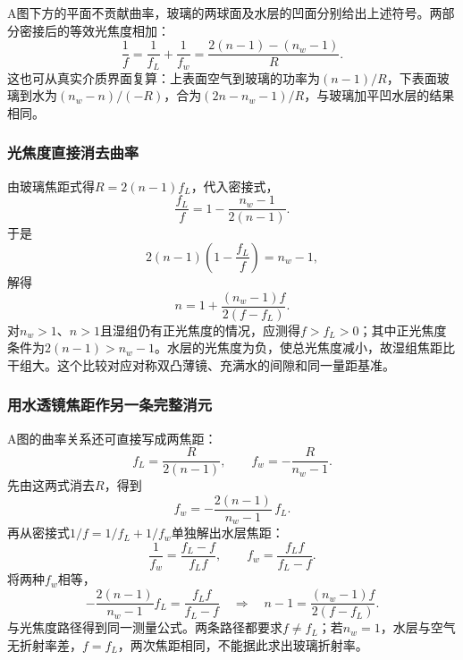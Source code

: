 \documentclass[UTF8,fontset=fandol,a4paper,11pt]{ctexart}
\newcommand{\figcaption}[1]{\par\vspace{2pt}{\small\color{muted}#1}\par}
\begin{document}
\begin{center}
\begin{minipage}{.97\linewidth}
\figcaption{解图光1.22A\quad 两个曲面及水层的曲率决定光焦度符号}
\end{minipage}\end{center}

A图下方的平面不贡献曲率，玻璃的两球面及水层的凹面分别给出上述符号。两部分密接后的等效光焦度相加：
\[
\frac1f=\frac1{f_L}+\frac1{f_w}
=\frac{2(n-1)-(n_w-1)}R.
\]
这也可从真实介质界面复算：上表面空气到玻璃的功率为$(n-1)/R$，下表面玻璃到水为$(n_w-n)/(-R)$，合为$(2n-n_w-1)/R$，与玻璃加平凹水层的结果相同。

\subsubsection*{光焦度直接消去曲率}
由玻璃焦距式得$R=2(n-1)f_L$，代入密接式，
\[
\frac{f_L}{f}
=1-\frac{n_w-1}{2(n-1)}.
\]
于是
\[
2(n-1)\left(1-\frac{f_L}{f}\right)=n_w-1,
\]
解得
\[
\boxed{n=1+\frac{(n_w-1)f}{2(f-f_L)}}.
\]
对$n_w>1$、$n>1$且湿组仍有正光焦度的情况，应测得$f>f_L>0$；其中正光焦度条件为$2(n-1)>n_w-1$。水层的光焦度为负，使总光焦度减小，故湿组焦距比干组大。这个比较对应对称双凸薄镜、充满水的间隙和同一量距基准。

\subsubsection*{用水透镜焦距作另一条完整消元}
A图的曲率关系还可直接写成两焦距：
\[
f_L=\frac{R}{2(n-1)},\qquad
f_w=-\frac{R}{n_w-1}.
\]
先由这两式消去$R$，得到
\[
f_w=-\frac{2(n-1)}{n_w-1}\,f_L.
\]
再从密接式$1/f=1/f_L+1/f_w$单独解出水层焦距：
\[
\frac1{f_w}=\frac{f_L-f}{f_Lf},
\qquad
f_w=\frac{f_Lf}{f_L-f}.
\]
将两种$f_w$相等，
\[
-\frac{2(n-1)}{n_w-1}f_L
=\frac{f_Lf}{f_L-f}
\quad\Longrightarrow\quad
n-1=\frac{(n_w-1)f}{2(f-f_L)}.
\]
与光焦度路径得到同一测量公式。两条路径都要求$f\ne f_L$；若$n_w=1$，水层与空气无折射率差，$f=f_L$，两次焦距相同，不能据此求出玻璃折射率。
\end{document}
